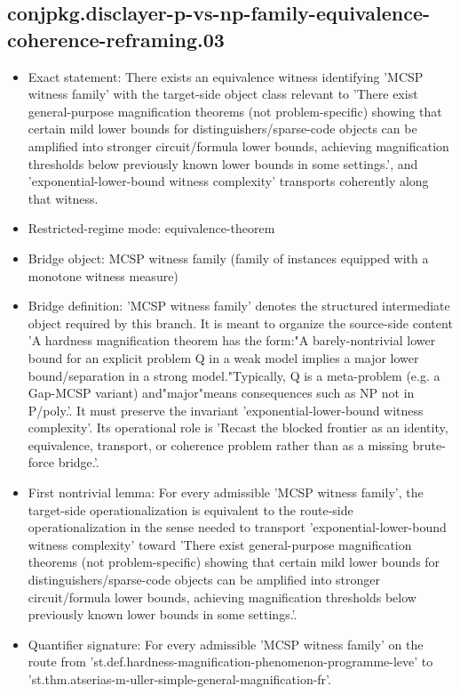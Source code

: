 \documentclass[11pt]{article}
\begin{document}
\subsection*{conjpkg.disclayer-p-vs-np-family-equivalence-coherence-reframing.03}
\begin{itemize}
\item Exact statement: There exists an equivalence witness identifying 'MCSP witness family' with the target-side object class relevant to 'There exist general-purpose magnification theorems (not problem-specific) showing that certain mild lower bounds for distinguishers/sparse-code objects can be amplified into stronger circuit/formula lower bounds, achieving magnification thresholds below previously known lower bounds in some settings.', and 'exponential-lower-bound witness complexity' transports coherently along that witness.
\item Restricted-regime mode: equivalence-theorem
\item Bridge object: MCSP witness family (family of instances equipped with a monotone witness measure)
\item Bridge definition: 'MCSP witness family' denotes the structured intermediate object required by this branch. It is meant to organize the source-side content 'A hardness magnification theorem has the form:"A barely-nontrivial lower bound for an explicit problem Q in a weak model implies a major lower bound/separation in a strong model."Typically, Q is a meta-problem (e.g. a Gap-MCSP variant) and"major"means consequences such as NP not in P/poly.'. It must preserve the invariant 'exponential-lower-bound witness complexity'. Its operational role is 'Recast the blocked frontier as an identity, equivalence, transport, or coherence problem rather than as a missing brute-force bridge.'.
\item First nontrivial lemma: For every admissible 'MCSP witness family', the target-side operationalization is equivalent to the route-side operationalization in the sense needed to transport 'exponential-lower-bound witness complexity' toward 'There exist general-purpose magnification theorems (not problem-specific) showing that certain mild lower bounds for distinguishers/sparse-code objects can be amplified into stronger circuit/formula lower bounds, achieving magnification thresholds below previously known lower bounds in some settings.'.
\item Quantifier signature: For every admissible 'MCSP witness family' on the route from 'st.def.hardness-magnification-phenomenon-programme-leve' to 'st.thm.atserias-m-uller-simple-general-magnification-fr'.

\end{itemize}
\end{document}

